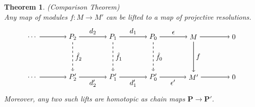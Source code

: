 \documentclass[11.5pt, twoside, a4paper, titlepage]{report}
\theoremstyle{definition}
\theoremstyle{plain}
\newtheorem{thm}[mydef]{Theorem}
\begin{document}
\begin{thm} \label{comparisonthm} (Comparison Theorem)\\
Any map of modules $f:M \to M'$ can be lifted to a map of projective resolutions.
\begin{equation*}
\begin{tikzpicture}[->,-latex, auto, main path/.style={->, semithick}, main node/.style={}]
\node	[main node]		(2) at (2,0)		{$\dots$};
\node	[main node]		(3) at (4,0)		{$P_2$};
\node [main node]		(4) at (6,0)		{$P_1$};
\node [main node]		(5) at (8,0)		{$P_0$};
\node	[main node]		(11) at (10,0)	{$M$};
\node [main node] 		(12) at (12,0)	{$0$};

\node	[main node]		(7) at (2,-2)		{$\dots$};
\node	[main node]		(8) at (4,-2)		{$P'_2$};
\node [main node]		(9) at (6,-2)		{$P'_1$};
\node [main node]		(10) at (8,-2)	{$P'_0$};
\node [main node]		(13) at (10,-2)	{$M'$};
\node [main node]		(14) at (12, -2)	{$0$};

\draw (2) edge [main path] node [auto] {$$} (3);
\draw (3) edge [main path] node [auto] {$d_2$} (4);
\draw (4) edge [main path] node [auto] {$d_1$} (5);
\draw (5) edge [main path] node [auto] {$\epsilon$} (11);
\draw (11) edge [main path] (12);

\draw (7) edge [main path] node [auto] {$$} (8);
\path (8) edge [main path] node [auto, swap] {$d'_2$} (9);
\draw (9) edge [main path] node [auto, swap] {$d'_1$} (10);
\draw (10) edge [main path] node [auto, swap] {$\epsilon'$} (13);
\draw (13) edge [main path] (14);

\draw (3) edge [dashed, ->, semithick] node [auto] {$\hat{f_2}$} (8);
\draw (4) edge [dashed, ->, semithick] node [auto] {$\hat{f_1}$} (9);
\draw (5) edge [dashed, ->, semithick] node [auto] {$\hat{f_0}$} (10);
\draw (11) edge [main path] node [auto] {$f$} (13);
\end{tikzpicture}
\end{equation*}
Moreover, any two such lifts are homotopic as chain maps $\mathbf{P}\to \mathbf{P'}$.
\end{thm}
\end{document}
